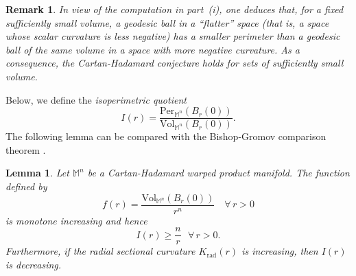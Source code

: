 \documentclass[a4paper,11pt,reqno]{amsart}
\theoremstyle{plain}
\newtheorem{lemma}{Lemma}[section]
\newtheorem{remark}{Remark}[section]
\numberwithin{equation}{section} \allowdisplaybreaks
\newcommand{\m}{\mathbb{M}^n}
\begin{document}
\medskip 

\begin{remark}
{\rm 
In view of the computation in part~(i), one deduces that, for a fixed sufficiently small volume, a geodesic ball in a ``flatter'' space (that is, a space whose scalar curvature is less negative) has a smaller perimeter than a geodesic ball of the same volume in a space with more negative curvature. As a consequence, \emph{the Cartan-Hadamard conjecture holds for sets of sufficiently small volume}.}
\end{remark}

\medskip 

Below, we define the \textit{isoperimetric quotient }
\begin{equation}\label{isoperimetric quotient}
    I(r)=\frac{\text{Per}_{\m}(B_r(0))}{\text{Vol}_{\m}(B_r(0))}.
\end{equation}
The following lemma can be compared with the Bishop-Gromov comparison theorem \cite[Theorem~1.3]{AMR}.
\begin{lemma}
   Let $\m$ be a Cartan-Hadamard warped product manifold. The function defined by 
    \begin{equation*}
        f(r)=\frac{\text{Vol}_{\m}(B_r(0))}{r^n} \quad \forall\,r>0
    \end{equation*}
    is monotone increasing and hence $$I(r) \geq \frac{n}{r}\,\,\,\, \forall \, r>0.$$
    Furthermore, if the radial sectional curvature $K_{\text{rad}}(r)$ is increasing, then $I(r)$ is decreasing.
\end{lemma}
\end{document}
